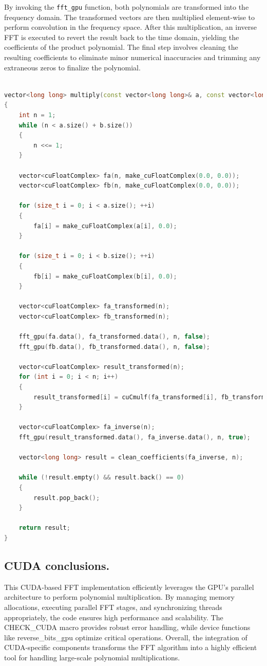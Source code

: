 \documentclass[12pt]{article}
\theoremstyle{definition}
\begin{document}
By invoking the \texttt{fft\_gpu} function, both polynomials are transformed into the frequency domain. The transformed vectors are then multiplied element-wise to perform convolution in the frequency space. After this multiplication, an inverse FFT is executed to revert the result back to the time domain, yielding the coefficients of the product polynomial. The final step involves cleaning the resulting coefficients to eliminate minor numerical inaccuracies and trimming any extraneous zeros to finalize the polynomial.
\begin{lstlisting}[language=C++, caption={Polynomial Multiplication Workflow.}]

vector<long long> multiply(const vector<long long>& a, const vector<long long>& b)
{
    int n = 1;
    while (n < a.size() + b.size())
    {
        n <<= 1;
    }

    vector<cuFloatComplex> fa(n, make_cuFloatComplex(0.0, 0.0));
    vector<cuFloatComplex> fb(n, make_cuFloatComplex(0.0, 0.0));

    for (size_t i = 0; i < a.size(); ++i)
    {
        fa[i] = make_cuFloatComplex(a[i], 0.0);
    }

    for (size_t i = 0; i < b.size(); ++i)
    {
        fb[i] = make_cuFloatComplex(b[i], 0.0);
    }

    vector<cuFloatComplex> fa_transformed(n);
    vector<cuFloatComplex> fb_transformed(n);

    fft_gpu(fa.data(), fa_transformed.data(), n, false);
    fft_gpu(fb.data(), fb_transformed.data(), n, false);

    vector<cuFloatComplex> result_transformed(n);
    for (int i = 0; i < n; i++)
    {
        result_transformed[i] = cuCmulf(fa_transformed[i], fb_transformed[i]);
    }

    vector<cuFloatComplex> fa_inverse(n);
    fft_gpu(result_transformed.data(), fa_inverse.data(), n, true);

    vector<long long> result = clean_coefficients(fa_inverse, n);

    while (!result.empty() && result.back() == 0)
    {
        result.pop_back();
    }

    return result;
}
\end{lstlisting}

\subsection{CUDA conclusions.}

This CUDA-based FFT implementation efficiently leverages the GPU's parallel architecture to perform polynomial multiplication. By managing memory allocations, executing parallel FFT stages, and synchronizing threads appropriately, the code ensures high performance and scalability. The CHECK\_CUDA macro provides robust error handling, while device functions like reverse\_bits\_gpu optimize critical operations. Overall, the integration of CUDA-specific components transforms the FFT algorithm into a highly efficient tool for handling large-scale polynomial multiplications.
\end{document}

